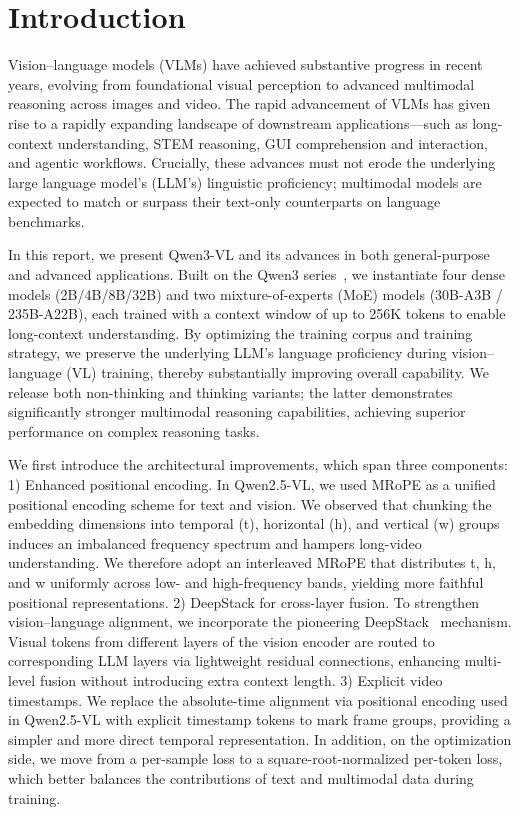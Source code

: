 \documentclass{article} %
\begin{document}
\newpage
\section{Introduction}
% 
Vision–language models (VLMs) have achieved substantive progress in recent years, evolving from foundational visual perception to advanced multimodal reasoning across images and video. The rapid advancement of VLMs has given rise to a rapidly expanding landscape of downstream applications—such as long-context understanding, STEM reasoning, GUI comprehension and interaction, and agentic workflows. Crucially, these advances must not erode the underlying large language model’s (LLM’s) linguistic proficiency; multimodal models are expected to match or surpass their text-only counterparts on language benchmarks.

In this report, we present Qwen3-VL and its advances in both general-purpose and advanced applications. Built on the Qwen3 series~\citep{qwen3}, we instantiate four dense models (2B/4B/8B/32B) and two mixture-of-experts (MoE) models (30B-A3B / 235B-A22B), each trained with a context window of up to 256K tokens to enable long-context understanding. By optimizing the training corpus and training strategy, we preserve the underlying LLM’s language proficiency during vision–language (VL) training, thereby substantially improving overall capability. We release both non-thinking and thinking variants; the latter demonstrates significantly stronger multimodal reasoning capabilities, achieving superior performance on complex reasoning tasks.

We first introduce the architectural improvements, which span three components:
1) Enhanced positional encoding. In Qwen2.5-VL, we used MRoPE as a unified positional encoding scheme for text and vision. We observed that chunking the embedding dimensions into temporal (t), horizontal (h), and vertical (w) groups induces an imbalanced frequency spectrum and hampers long-video understanding. We therefore adopt an interleaved MRoPE that distributes t, h, and w uniformly across low- and high-frequency bands, yielding more faithful positional representations.
2) DeepStack for cross-layer fusion. To strengthen vision–language alignment, we incorporate the pioneering DeepStack~\citep{meng2024deepstack} mechanism. Visual tokens from different layers of the vision encoder are routed to corresponding LLM layers via lightweight residual connections, enhancing multi-level fusion without introducing extra context length.
3) Explicit video timestamps. We replace the absolute-time alignment via positional encoding used in Qwen2.5-VL with explicit timestamp tokens to mark frame groups, providing a simpler and more direct temporal representation.
In addition, on the optimization side, we move from a per-sample loss to a square-root-normalized per-token loss, which better balances the contributions of text and multimodal data during training.
\end{document}
